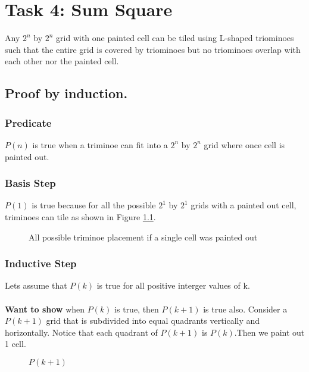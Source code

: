 \chapter{Task 4: Sum Square}
\begin{thm}[]
	Any $2^n$ by $2^n$
	grid with one painted cell can be tiled using L-shaped triominoes
	such that the entire grid is covered by triominoes but no triominoes overlap with each other
	nor the painted cell. 
	\par
\end{thm}	


\section{Proof by induction.}
\subsection{Predicate}
$P(n)$ is true when a triminoe can fit into a $2^n$ by $2^n$ grid where once cell is painted out.

\subsection{Basis Step}
$P(1)$ is true because for all the possible $2^1$ by $2^1$ grids with a painted out cell, triminoes can tile as shown in Figure \ref{fig:base-cases}. 

\begin{figure}[h]
	\centering
	\caption{All possible triminoe placement if a single cell was painted out}
	\label{fig:base-cases}
\end{figure}

\subsection{Inductive Step}
Lets assume that $P(k)$ is true for all positive interger values of k.\\\\
\textbf{Want to show} when $P(k)$ is true, then $P(k+1)$ is true also.
Consider a $P(k+1)$ grid that is subdivided into equal quadrants vertically and horizontally. Notice that each quadrant of $P(k+1)$ is $P(k)$.Then we paint out 1 cell.\\

\begin{figure}[ht]
	\vspace{-10pt}
	\centering
	\vspace{-10pt}
	\caption{$P(k+1)$}
	\label{fig:T1-figure2}
\end{figure}

